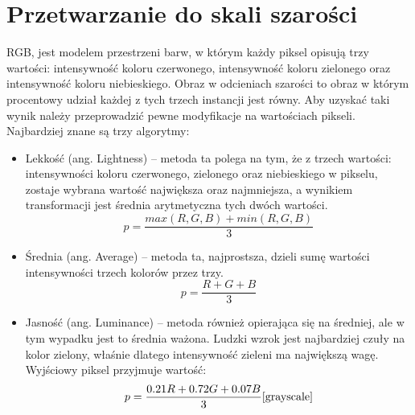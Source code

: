 \documentclass[eng,oneside]{mgr}
\begin{document}
\section{Przetwarzanie do skali szarości}
\hspace{1cm} RGB, jest modelem przestrzeni barw, w którym każdy piksel opisują trzy wartości: intensywność koloru czerwonego, intensywność koloru zielonego oraz intensywność koloru niebieskiego. Obraz w odcieniach szarości to obraz w którym procentowy udział każdej z tych trzech instancji jest równy. Aby uzyskać taki wynik należy przeprowadzić pewne modyfikacje na wartościach pikseli. Najbardziej znane są trzy algorytmy:
\begin{itemize}
\item Lekkość (ang. Lightness) – metoda ta polega na tym, że z trzech wartości: intensywności koloru czerwonego, zielonego oraz niebieskiego w pikselu, zostaje wybrana wartość największa oraz najmniejsza, a wynikiem transformacji jest średnia arytmetyczna tych dwóch wartości.
\\
\begin{equation}
p=\frac{max(R,G,B) + min(R,G,B)}{3}
\end{equation}
\item Średnia (ang. Average) – metoda ta, najprostsza, dzieli sumę wartości intensywności trzech kolorów przez trzy.
\\
\begin{equation}
p=\frac{R + G + B}{3}
\end{equation}
\item Jasność (ang. Luminance) – metoda również opierająca się na średniej, ale w tym wypadku jest to średnia ważona. Ludzki wzrok jest najbardziej czuły na kolor zielony, właśnie dlatego intensywność zieleni ma największą wagę. Wyjściowy piksel przyjmuje wartość:
\\
\begin{equation}
p=\frac{0.21R + 0.72G + 0.07B}{3}\cite{grayscale}
\end{equation}

\end{itemize}
\end{document}
